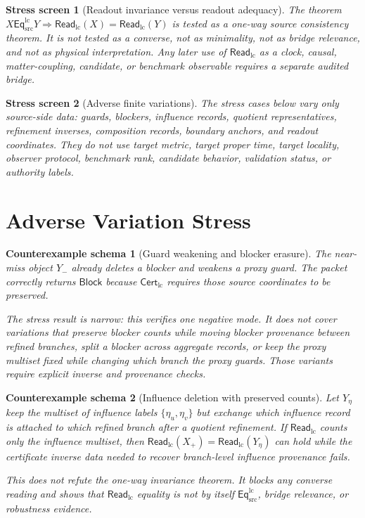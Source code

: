 \documentclass[11pt]{article}
\newcommand{\EqLC}{\mathsf{Eq}_{\mathrm{src}}^{\mathrm{lc}}}
\newcommand{\CertLC}{\mathsf{Cert}_{\mathrm{lc}}}
\newcommand{\ReadLC}{\mathsf{Read}_{\mathrm{lc}}}
\newcommand{\Block}{\mathsf{Block}}
\newtheorem{stressscreen}{Stress screen}
\newtheorem{counterexample}{Counterexample schema}
\begin{document}
\begin{stressscreen}[Readout invariance versus readout adequacy]
The theorem \(X\EqLC Y\Rightarrow \ReadLC(X)=\ReadLC(Y)\) is tested as
a one-way source consistency theorem. It is not tested as a converse,
not as minimality, not as bridge relevance, and not as physical
interpretation. Any later use of \(\ReadLC\) as a clock, causal,
matter-coupling, candidate, or benchmark observable requires a separate
audited bridge.
\end{stressscreen}

\begin{stressscreen}[Adverse finite variations]
The stress cases below vary only source-side data: guards, blockers,
influence records, quotient representatives, refinement inverses,
composition records, boundary anchors, and readout coordinates. They do
not use target metric, target proper time, target locality, observer
protocol, benchmark rank, candidate behavior, validation status, or
authority labels.
\end{stressscreen}

\section{Adverse Variation Stress}

\begin{counterexample}[Guard weakening and blocker erasure]
The near-miss object \(Y_{-}\) already deletes a blocker and weakens a
proxy guard. The packet correctly returns \(\Block\) because
\(\CertLC\) requires those source coordinates to be preserved.

The stress result is narrow: this verifies one negative mode. It does
not cover variations that preserve blocker counts while moving blocker
provenance between refined branches, split a blocker across aggregate
records, or keep the proxy multiset fixed while changing which branch
the proxy guards. Those variants require explicit inverse and
provenance checks.
\end{counterexample}

\begin{counterexample}[Influence deletion with preserved counts]
Let \(Y_{\eta}\) keep the multiset of influence labels
\(\{\eta_u,\eta_v\}\) but exchange which influence record is attached
to which refined branch after a quotient refinement. If \(\ReadLC\)
counts only the influence multiset, then
\(\ReadLC(X_{+})=\ReadLC(Y_{\eta})\) can hold while the certificate
inverse data needed to recover branch-level influence provenance fails.

This does not refute the one-way invariance theorem. It blocks any
converse reading and shows that \(\ReadLC\) equality is not by itself
\(\EqLC\), bridge relevance, or robustness evidence.
\end{counterexample}
\end{document}
